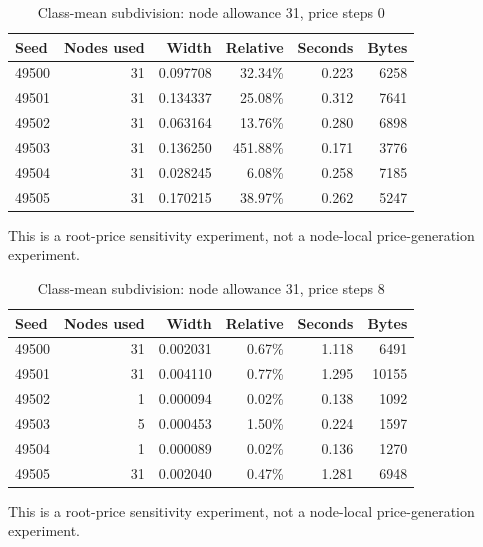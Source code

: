 \begin{table}[p]\centering
\caption{Class-mean subdivision: node allowance 31, price steps 0}\label{tab:price0ec52}
\setlength{\tabcolsep}{4pt}
\begin{tabular}{lrrrrr}
\toprule
Seed & Nodes used & Width & Relative & Seconds & Bytes\\
\midrule
49500 & 31 & 0.097708 & 32.34\% & 0.223 & 6258\\
49501 & 31 & 0.134337 & 25.08\% & 0.312 & 7641\\
49502 & 31 & 0.063164 & 13.76\% & 0.280 & 6898\\
49503 & 31 & 0.136250 & 451.88\% & 0.171 & 3776\\
49504 & 31 & 0.028245 & 6.08\% & 0.258 & 7185\\
49505 & 31 & 0.170215 & 38.97\% & 0.262 & 5247\\
\bottomrule\end{tabular}
\par\vspace{6pt}\begin{minipage}{\textwidth}This is a root-price sensitivity experiment, not a node-local price-generation experiment.\end{minipage}
\end{table}
\begin{table}[p]\centering
\caption{Class-mean subdivision: node allowance 31, price steps 8}\label{tab:price8ec52}
\setlength{\tabcolsep}{4pt}
\begin{tabular}{lrrrrr}
\toprule
Seed & Nodes used & Width & Relative & Seconds & Bytes\\
\midrule
49500 & 31 & 0.002031 & 0.67\% & 1.118 & 6491\\
49501 & 31 & 0.004110 & 0.77\% & 1.295 & 10155\\
49502 & 1 & 0.000094 & 0.02\% & 0.138 & 1092\\
49503 & 5 & 0.000453 & 1.50\% & 0.224 & 1597\\
49504 & 1 & 0.000089 & 0.02\% & 0.136 & 1270\\
49505 & 31 & 0.002040 & 0.47\% & 1.281 & 6948\\
\bottomrule\end{tabular}
\par\vspace{6pt}\begin{minipage}{\textwidth}This is a root-price sensitivity experiment, not a node-local price-generation experiment.\end{minipage}
\end{table}
